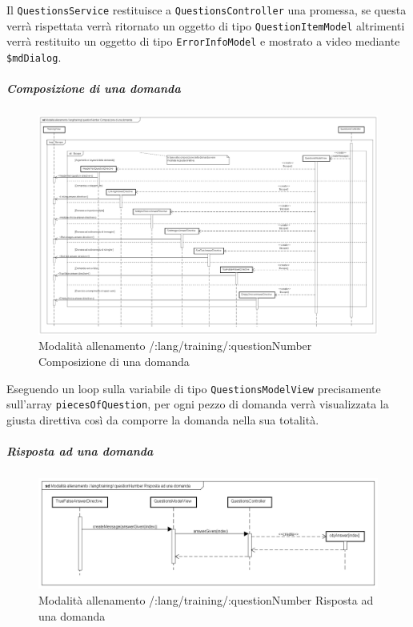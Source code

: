 Il \texttt{QuestionsService} restituisce a \texttt{QuestionsController} una promessa, se questa verrà rispettata verrà ritornato un oggetto di tipo \texttt{QuestionItemModel} altrimenti verrà restituito un oggetto di tipo \texttt{ErrorInfoModel} e mostrato a video mediante \texttt{\$mdDialog}.


\subparagraph{Composizione di una domanda}

\label{Modalità allenamento /:lang/training/:questionNumber Composizione di una domanda}

\begin{figure}[ht]
	\centering
	\includegraphics[scale=0.25,keepaspectratio]{UML/DiagrammiDiSequenza/Front-end/Training_makingAQuestion.png}
	\caption{Modalità allenamento /:lang/training/:questionNumber Composizione di una domanda}
\end{figure} \FloatBarrier

Eseguendo un loop sulla variabile di tipo \texttt{QuestionsModelView} precisamente sull'array \texttt{piecesOfQuestion}, per ogni pezzo di domanda verrà visualizzata la giusta direttiva così da comporre la domanda nella sua totalità.

\subparagraph{Risposta ad una domanda}

\label{Modalità allenamento /:lang/training/:questionNumber Risposta ad una domanda}

\begin{figure}[ht]
	\centering
	\includegraphics[scale=0.4,keepaspectratio]{UML/DiagrammiDiSequenza/Front-end/Training_answerAQuestion.png}
	\caption{Modalità allenamento /:lang/training/:questionNumber Risposta ad una domanda}
\end{figure} \FloatBarrier

